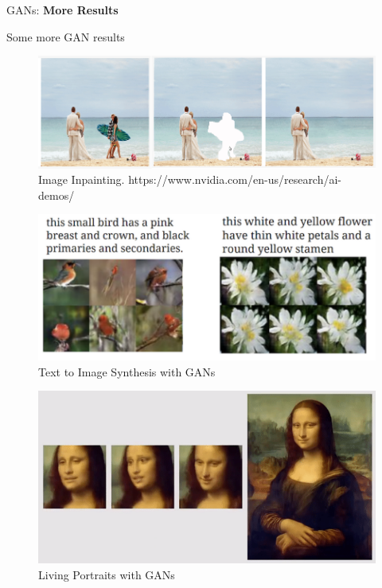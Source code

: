 \begin{frame}{}
    \LARGE GANs: \textbf{More Results}
\end{frame}

\begin{frame}[allowframebreaks]{Some more GAN results}
\begin{figure}
    \centering
    \includegraphics[height=0.8\textheight, width=\textwidth, keepaspectratio]{images/gan/gan_results_4.png}
    \caption*{Image Inpainting. https://www.nvidia.com/en-us/research/ai-demos/}
\end{figure}

\framebreak

\begin{figure}
    \centering
    \includegraphics[height=0.8\textheight, width=\textwidth, keepaspectratio]{images/gan/gan_results_5.png}
    \caption*{Text to Image Synthesis with GANs}
\end{figure}

\framebreak

\begin{figure}
    \centering
    \includegraphics[height=0.8\textheight, width=\textwidth, keepaspectratio]{images/gan/gan_results_6.png}
    \caption*{Living Portraits with GANs}
\end{figure}


\end{frame}
